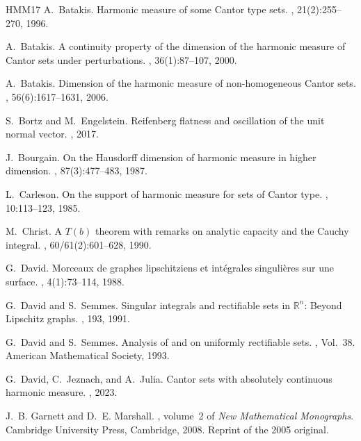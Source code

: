\documentclass{article}
\theoremstyle{plain}
\theoremstyle{plain}
\theoremstyle{definition}
\theoremstyle{plain}
\begin{document}
\begin{thebibliography}{HMM{\etalchar{+}}17}
A.~Batakis.
\newblock Harmonic measure of some {C}antor type sets.
, 21(2):255--270, 1996.

A.~Batakis.
\newblock A continuity property of the dimension of the harmonic measure of
  {C}antor sets under perturbations.
, 36(1):87--107,
  2000.

A.~Batakis.
\newblock Dimension of the harmonic measure of non-homogeneous {C}antor sets.
, 56(6):1617--1631, 2006.

S.~Bortz and M.~Engelstein.
\newblock Reifenberg flatness and oscillation of the unit normal vector.
, 2017.

J.~Bourgain.
\newblock On the {H}ausdorff dimension of harmonic measure in higher dimension.
, 87(3):477--483, 1987.

L.~Carleson.
\newblock On the support of harmonic measure for sets of {C}antor type.
, 10:113--123, 1985.

M.~Christ.
\newblock A {$T(b)$} theorem with remarks on analytic capacity and the {C}auchy
  integral.
, 60/61(2):601--628, 1990.

G.~David.
\newblock Morceaux de graphes lipschitziens et int\'egrales singuli\`eres sur
  une surface.
, 4(1):73--114, 1988.

G.~David and S.~Semmes.
\newblock Singular integrals and rectifiable sets in $\mathbb{R}^n$: Beyond
  Lipschitz graphs.
, 193, 1991.

G.~David and S.~Semmes.
\newblock Analysis of and on uniformly rectifiable sets.
, Vol.~38. American
  Mathematical Society, 1993.

G.~David, C.~Jeznach, and A.~Julia.
\newblock Cantor sets with absolutely continuous harmonic measure.
, 2023.



J.~B. Garnett and D.~E. Marshall.
, volume~2 of {\em New Mathematical
  Monographs}.
\newblock Cambridge University Press, Cambridge, 2008.
\newblock Reprint of the 2005 original.


\end{thebibliography}
\end{document}
